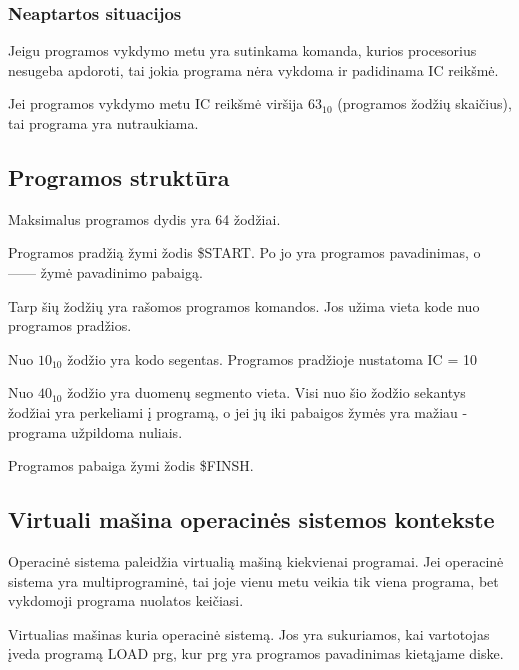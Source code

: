 \documentclass{VUMIFInfKursinis}
\begin{document}
\subsubsection{Neaptartos situacijos}

Jeigu programos vykdymo metu yra sutinkama komanda, kurios procesorius nesugeba apdoroti, tai jokia programa nėra vykdoma ir padidinama IC reikšmė.

Jei programos vykdymo metu IC reikšmė viršija $63_{10}$ (programos žodžių skaičius), tai programa yra nutraukiama.

\subsection{Programos struktūra}

Maksimalus programos dydis yra 64 žodžiai.

Programos pradžią žymi žodis \$START. Po jo yra programos pavadinimas, o ------ žymė pavadinimo pabaigą. 

Tarp šių žodžių yra rašomos programos komandos. Jos užima vieta kode nuo programos pradžios. 

Nuo $10_{10}$ žodžio yra kodo segentas. Programos pradžioje nustatoma IC = 10

Nuo $40_{10}$ žodžio yra duomenų segmento vieta. Visi nuo šio žodžio sekantys žodžiai yra perkeliami į programą, o jei jų iki pabaigos žymės yra mažiau - programa užpildoma nuliais.

Programos pabaiga žymi žodis \$FINSH. 

\subsection{Virtuali mašina operacinės sistemos kontekste}

Operacinė sistema paleidžia virtualią mašiną kiekvienai programai. Jei operacinė sistema yra multiprograminė, tai joje vienu metu veikia tik viena programa, bet vykdomoji programa nuolatos keičiasi.

Virtualias mašinas kuria operacinė sistemą. Jos yra sukuriamos, kai vartotojas įveda programą LOAD prg, kur prg yra programos pavadinimas kietąjame diske.

\printbibliography[heading=bibintoc] %
\appendix  %
\end{document}
